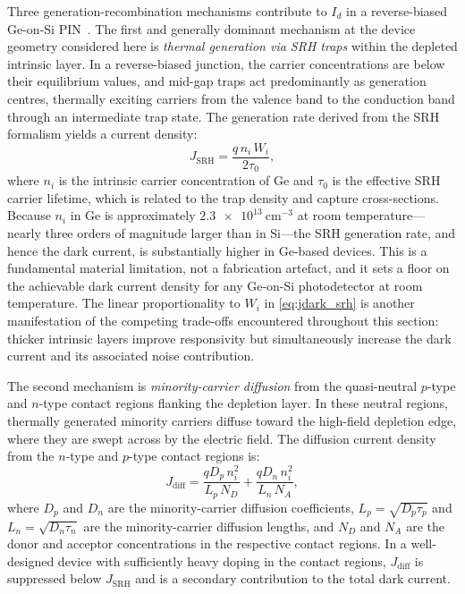 Three generation-recombination mechanisms contribute to $I_d$ in a reverse-biased
Ge-on-Si PIN~\cite{SzeNg2006}. The first and generally dominant mechanism at
the device geometry considered here is \emph{thermal generation via SRH traps}
within the depleted intrinsic layer. In a reverse-biased junction, the carrier
concentrations are below their equilibrium values, and mid-gap traps act
predominantly as generation centres, thermally exciting carriers from the valence
band to the conduction band through an intermediate trap state. The generation
rate derived from the SRH formalism yields a current density:
\begin{equation}
    J_{\mathrm{SRH}} = \frac{q\,n_i\,W_i}{2\tau_0},
    \label{eq:metrics_jdark_srh}
\end{equation}
where $n_i$ is the intrinsic carrier concentration of Ge and $\tau_0$ is the
effective SRH carrier lifetime, which is related to the trap density and capture
cross-sections. Because $n_i$ in Ge is approximately $\SI{2.3e13}{\centi\metre^{-3}}$
at room temperature---nearly three orders of magnitude larger than in Si---the
SRH generation rate, and hence the dark current, is substantially higher in
Ge-based devices. This is a fundamental material limitation, not a fabrication
artefact, and it sets a floor on the achievable dark current density for any
Ge-on-Si photodetector at room temperature. The linear proportionality to $W_i$
in \cref{eq:jdark_srh} is another manifestation of the competing trade-offs
encountered throughout this section: thicker intrinsic layers improve
responsivity but simultaneously increase the dark current and its associated
noise contribution.

The second mechanism is \emph{minority-carrier diffusion} from the
quasi-neutral $p$-type and $n$-type contact regions flanking the depletion
layer. In these neutral regions, thermally generated minority carriers diffuse
toward the high-field depletion edge, where they are swept across by the electric
field. The diffusion current density from the $n$-type and $p$-type contact
regions is:
\begin{equation}
    J_{\mathrm{diff}}
    = \frac{qD_p\,n_i^2}{L_p\,N_D} + \frac{qD_n\,n_i^2}{L_n\,N_A},
    \label{eq:metrics_jdark_diff}
\end{equation}
where $D_p$ and $D_n$ are the minority-carrier diffusion coefficients, $L_p =
\sqrt{D_p\tau_p}$ and $L_n = \sqrt{D_n\tau_n}$ are the minority-carrier
diffusion lengths, and $N_D$ and $N_A$ are the donor and acceptor concentrations
in the respective contact regions. In a well-designed device with sufficiently
heavy doping in the contact regions, $J_{\mathrm{diff}}$ is suppressed below
$J_{\mathrm{SRH}}$ and is a secondary contribution to the total dark current.

